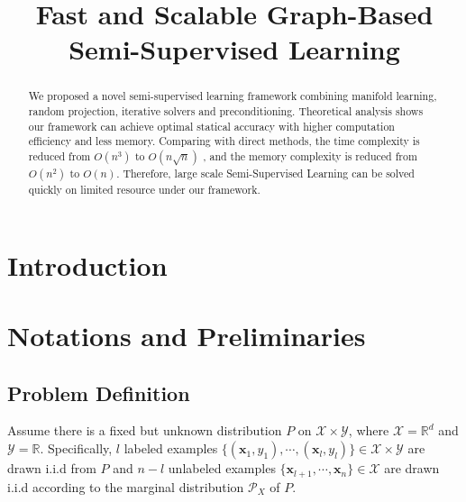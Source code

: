 \documentclass{article}
\title{Fast and Scalable Graph-Based Semi-Supervised Learning}
\begin{document}
\maketitle

\begin{abstract}
We proposed a novel semi-supervised learning framework combining manifold learning, random projection, iterative solvers and preconditioning.
Theoretical analysis shows our framework can achieve optimal statical accuracy with higher computation efficiency and less memory.
Comparing with direct methods, the time complexity is reduced from $O(n^3)$ to $O(n\sqrt{n})$ ,
and the memory complexity is reduced from $O(n^2)$ to $O(n)$.
Therefore, large scale Semi-Supervised Learning can be solved quickly on limited resource under our framework.
\end{abstract}

\section{Introduction}

\section{Notations and Preliminaries}
\subsection{Problem Definition}
Assume there is a fixed but unknown distribution $P$ on $\mathcal{X}\times\mathcal{Y}$,
where $\mathcal{X} = \mathbb{R}^d$ and $\mathcal{Y} = \mathbb{R}$.
Specifically, $l$ labeled examples $\{(\mathbf{x}_1,y_1), \cdots, (\mathbf{x}_l,y_l)\} \in \mathcal{X} \times \mathcal{Y}$ are drawn i.i.d from $P$
and $n-l$ unlabeled examples $\{\mathbf{x}_{l+1}, \cdots, \mathbf{x}_{n}\} \in \mathcal{X}$
are drawn i.i.d according to the marginal distribution $\mathcal{P}_X$ of $P$.
\end{document}
